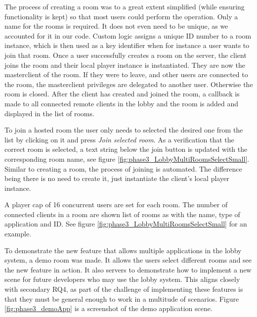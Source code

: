 The process of creating a room was to a great extent simplified (while ensuring functionality is kept) so that most users could perform the operation. Only a name for the rooms is required. It does not even need to be unique, as we accounted for it in our code. Custom logic assigns a unique ID number to a room instance, which is then used as a key identifier when for instance a user wants to join that room. Once a user successfully creates a room on the server, the client joins the room and their local player instance is instantiated. They are now the masterclient of the room. If they were to leave, and other users are connected to the room, the masterclient privileges are delegated to another user. Otherwise the room is closed. After the client has created and joined the room, a callback is made to all connected remote clients in the lobby and the room is added and displayed in the list of rooms. 

To join a hosted room the user only needs to selected the desired one from the list by clicking on it and press \textit{Join selected room}. As a verification that the correct room is selected, a text string below the join button is updated with the corresponding room name, see figure \ref{fig:phase3_LobbyMultiRoomsSelectSmall}. Similar to creating a room, the process of joining is automated. The difference being there is no need to create it, just instantiate the client's local player instance. 

A player cap of 16 concurrent users are set for each room. The number of connected clients in a room are shown list of rooms as with the name, type of application and ID. See figure \ref{fig:phase3_LobbyMultiRoomsSelectSmall} for an example.  


To demonstrate the new feature that allows multiple applications in the lobby system, a demo room was made. It allows the users select different rooms and see the new feature in action. It also servers to demonstrate how to implement a new scene for future developers who may use the lobby system. This aligns closely with secondary RQ4, as part of the challenge of implementing these features is that they must be general enough to work in a multitude of scenarios. Figure \ref{fig:phase3_demoApp} is a screenshot of the demo application scene. 


